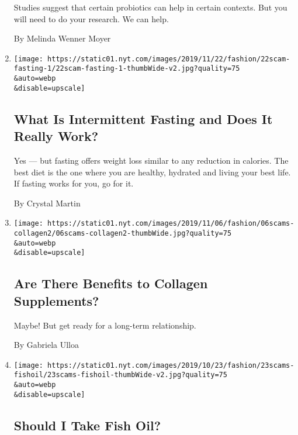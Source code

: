 \begin{enumerate}
  Studies suggest that certain probiotics can help in certain contexts.
  But you will need to do your research. We can help.

  By Melinda Wenner Moyer
\item
  \href{/2019/11/23/style/self-care/intermittent-fasting-benefits.html}{}

  \texttt{[image: https://static01.nyt.com/images/2019/11/22/fashion/22scam-fasting-1/22scam-fasting-1-thumbWide-v2.jpg?quality=75\\\&auto=webp\\\&disable=upscale]}

  \hypertarget{what-is-intermittent-fasting-and-does-it-really-work}{%
  \subsection{What Is Intermittent Fasting and Does It Really
  Work?}\label{what-is-intermittent-fasting-and-does-it-really-work}}

  Yes --- but fasting offers weight loss similar to any reduction in
  calories. The best diet is the one where you are healthy, hydrated and
  living your best life. If fasting works for you, go for it.

  By Crystal Martin
\item
  \href{/2019/11/09/style/self-care/collagen-benefits.html}{}

  \texttt{[image: https://static01.nyt.com/images/2019/11/06/fashion/06scams-collagen2/06scams-collagen2-thumbWide.jpg?quality=75\\\&auto=webp\\\&disable=upscale]}

  \hypertarget{are-there-benefits-to-collagen-supplements}{%
  \subsection{Are There Benefits to Collagen
  Supplements?}\label{are-there-benefits-to-collagen-supplements}}

  Maybe! But get ready for a long-term relationship.

  By Gabriela Ulloa
\item
  \href{/2019/11/01/style/self-care/fish-oil-benefits.html}{}

  \texttt{[image: https://static01.nyt.com/images/2019/10/23/fashion/23scams-fishoil/23scams-fishoil-thumbWide-v2.jpg?quality=75\\\&auto=webp\\\&disable=upscale]}

  \hypertarget{should-i-take-fish-oil}{%
  \subsection{Should I Take Fish Oil?}\label{should-i-take-fish-oil}}


\end{enumerate}

